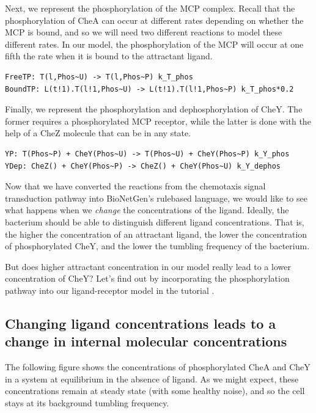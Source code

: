 Next, we represent the phosphorylation of the MCP complex. Recall that the phosphorylation of CheA can occur at different rates depending on whether the MCP is bound, and so we will need two different reactions to model these different rates. In our model, the phosphorylation of the MCP will occur at one fifth the rate when it is bound to the attractant ligand.

\begin{verbatim}
FreeTP: T(l,Phos~U) -> T(l,Phos~P) k_T_phos   
BoundTP: L(t!1).T(l!1,Phos~U) -> L(t!1).T(l!1,Phos~P) k_T_phos*0.2
\end{verbatim}

Finally, we represent the phosphorylation and dephosphorylation of CheY. The former requires a phosphorylated MCP receptor, while the latter is done with the help of a CheZ molecule that can be in any state.

\begin{verbatim}
YP: T(Phos~P) + CheY(Phos~U) -> T(Phos~U) + CheY(Phos~P) k_Y_phos
YDep: CheZ() + CheY(Phos~P) -> CheZ() + CheY(Phos~U) k_Y_dephos
\end{verbatim}

Now that we have converted the reactions from the chemotaxis signal transduction pathway into BioNetGen's rule\-based language, we would like to see what happens when we \textit{change} the concentrations of the ligand. Ideally, the bacterium should be able to distinguish different ligand concentrations. That is, the higher the concentration of an attractant ligand, the lower the concentration of phosphorylated CheY, and the lower the tumbling frequency of the bacterium.

But does higher attractant concentration in our model really lead to a lower concentration of CheY? Let's find out by incorporating the phosphorylation pathway into our ligand-receptor model in the tutorial .


\FloatBarrier
{}
{}
\subsection{Changing ligand concentrations leads to a change in internal molecular concentrations}

The following figure shows the concentrations of phosphorylated CheA and CheY in a system at equilibrium in the absence of ligand. As we might expect, these concentrations remain at steady state (with some healthy noise), and so the cell stays at its background tumbling frequency.

